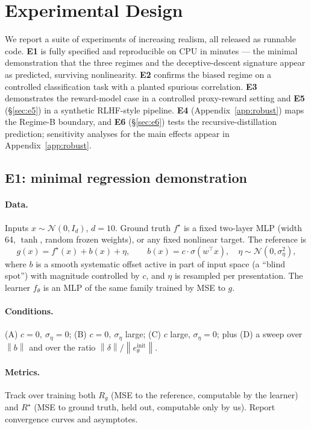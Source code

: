 \documentclass[10pt]{article} %
\theoremstyle{plain}
\theoremstyle{remark}
\newcommand{\fstar}{f^{\star}}
\newcommand{\norm}[1]{\left\lVert #1 \right\rVert}
\begin{document}
\section{Experimental Design}
\label{sec:experiments}

We report a suite of experiments of increasing realism, all released as runnable code. \textbf{E1} is fully specified and reproducible on CPU in minutes --- the minimal demonstration that the three regimes and the deceptive-descent signature appear as predicted, surviving nonlinearity. \textbf{E2} confirms the biased regime on a controlled classification task with a planted spurious correlation. \textbf{E3} demonstrates the reward-model case in a controlled proxy-reward setting and \textbf{E5} (\S\ref{sec:e5}) in a synthetic RLHF-style pipeline. \textbf{E4} (Appendix~\ref{app:robust}) maps the Regime-B boundary, and \textbf{E6} (\S\ref{sec:e6}) tests the recursive-distillation prediction; sensitivity analyses for the main effects appear in Appendix~\ref{app:robust}.

\subsection{E1: minimal regression demonstration}
\paragraph{Data.} Inputs $x\sim\mathcal{N}(0,I_d)$, $d=10$. Ground truth $\fstar$ is a fixed two-layer MLP (width 64, $\tanh$, random frozen weights), or any fixed nonlinear target. The reference is
\[
g(x) = \fstar(x) + b(x) + \eta, \qquad b(x) = c\cdot\sigma(w^\top x),\quad \eta\sim\mathcal{N}(0,\sigma_\eta^2),
\]
where $b$ is a smooth systematic offset active in part of input space (a ``blind spot'') with magnitude controlled by $c$, and $\eta$ is resampled per presentation. The learner $f_\theta$ is an MLP of the same family trained by MSE to $g$.

\paragraph{Conditions.}
(A) $c=0,\ \sigma_\eta=0$;\quad
(B) $c=0,\ \sigma_\eta$ large;\quad
(C) $c$ large, $\sigma_\eta=0$;\quad
plus (D) a sweep over $\norm{b}$ and over the ratio $\norm{\delta}/\norm{e_\theta^{\text{init}}}$.

\paragraph{Metrics.} Track over training both $R_g$ (MSE to the reference, computable by the learner) and $R^\star$ (MSE to ground truth, held out, computable only by us). Report convergence curves and asymptotes.
\end{document}

